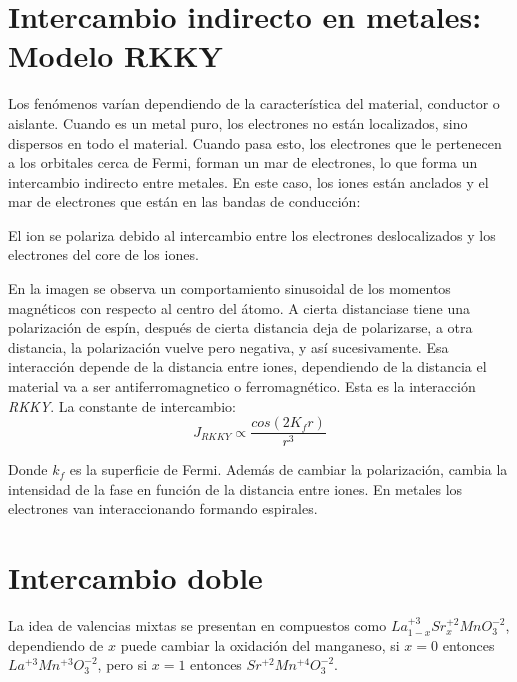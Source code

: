 \documentclass[11pt,fleqn]{book}
\begin{document}
\section{Intercambio indirecto en metales: Modelo RKKY}

Los fenómenos varían dependiendo de la característica del material, conductor o aislante. Cuando es un metal puro, los electrones no están localizados, sino dispersos en todo el material. Cuando pasa esto, los electrones que le pertenecen a los orbitales cerca de Fermi, forman un mar de electrones, lo que forma un intercambio indirecto entre metales. En este caso, los iones están anclados y el mar de electrones que están en las bandas de conducción:



El ion se polariza debido al intercambio entre los electrones deslocalizados y los electrones del core de los iones. 


En la imagen se observa un comportamiento sinusoidal de los momentos magnéticos con respecto al centro del átomo. A cierta distanciase tiene una polarización de espín, después de cierta distancia deja de polarizarse, a otra distancia, la polarización vuelve pero negativa, y así sucesivamente. Esa interacción depende de la distancia entre iones, dependiendo de la distancia el material va a ser antiferromagnetico o ferromagnético. Esta es la interacción \textit{RKKY}. La constante de intercambio:
\begin{equation}
J_{RKKY}\propto\frac{cos(2K_{f}r)}{r^{3}}
    \label{Eq. 5.12}
\end{equation}
    
    
    
Donde $k_{f}$ es la superficie de Fermi. Además de cambiar la polarización, cambia la intensidad de la fase en función de la distancia entre iones. En metales los electrones van interaccionando formando espirales.
    
\section{Intercambio doble}

La idea de valencias mixtas se presentan en compuestos como $La_{1-x}^{+3}Sr_{x}^{+2}MnO_{3}^{-2}$, dependiendo de $x$ puede cambiar la oxidación del manganeso, si $x=0$ entonces $La^{+3}Mn^{+3}O_{3}^{-2}$, pero si $x=1$ entonces $Sr^{+2}Mn^{+4}O_{3}^{-2}$. 
\end{document}
